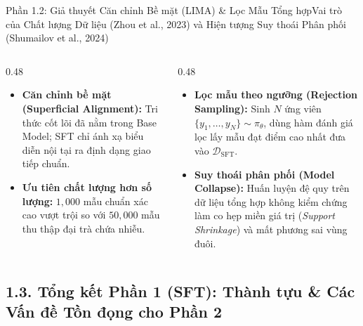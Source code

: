 \begin{frame}{Phần 1.2: Giả thuyết Căn chỉnh Bề mặt (LIMA) \& Lọc Mẫu Tổng hợp}{Vai trò của Chất lượng Dữ liệu (Zhou et al., 2023) và Hiện tượng Suy thoái Phân phối (Shumailov et al., 2024)}
  \begin{columns}[T,onlytextwidth]
    \begin{column}{0.48\textwidth}
      \footnotesize
      \begin{itemize}\setlength{\itemsep}{5pt}
        \item \textbf{Căn chỉnh bề mặt (Superficial Alignment):} Tri thức cốt lõi đã nằm trong Base Model; SFT chỉ ánh xạ biểu diễn nội tại ra định dạng giao tiếp chuẩn.
        \item \textbf{Ưu tiên chất lượng hơn số lượng:} $1{,}000$ mẫu chuẩn xác cao vượt trội so với $50{,}000$ mẫu thu thập đại trà chứa nhiễu.
      \end{itemize}
    \end{column}
    \begin{column}{0.48\textwidth}
      \footnotesize
      \begin{itemize}\setlength{\itemsep}{5pt}
        \item \textbf{Lọc mẫu theo ngưỡng (Rejection Sampling):} Sinh $N$ ứng viên $\{y_1, \dots, y_N\} \sim \pi_\theta$, dùng hàm đánh giá lọc lấy mẫu đạt điểm cao nhất đưa vào $\mathcal{D}_{\text{SFT}}$.
        \item \textbf{Suy thoái phân phối (Model Collapse):} Huấn luyện đệ quy trên dữ liệu tổng hợp không kiểm chứng làm co hẹp miền giá trị (\textit{Support Shrinkage}) và mất phương sai vùng đuôi.
      \end{itemize}
    \end{column}
  \end{columns}
\end{frame}

\subsection{1.3. Tổng kết Phần 1 (SFT): Thành tựu \& Các Vấn đề Tồn đọng cho Phần 2}

